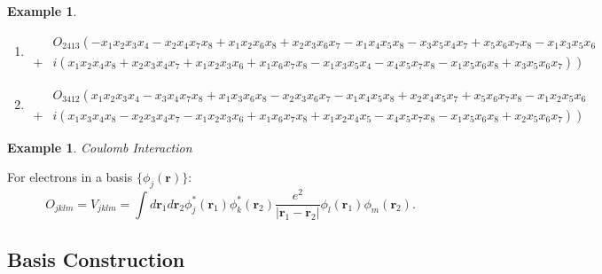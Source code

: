 \documentclass[aps,preprint]{revtex4}%
\newtheorem{example}[theorem]{Example}
\begin{document}
\begin{example}
\begin{enumerate}
\item
\begin{align}
&  O_{2413}\left(  -\overset{}{x_{1}x_{2}x_{3}x_{4}-x_{2}x_{4}x_{7}x_{8}%
+x_{1}x_{2}x_{6}x_{8}+x_{2}x_{3}x_{6}x_{7}-x_{1}x_{4}x_{5}x_{8}-x_{3}%
x_{5}x_{4}x_{7}+x_{5}x_{6}x_{7}x_{8}-x_{1}x_{3}x_{5}x_{6}}\right. \\
+  &  \left.  i\left(  \overset{}{x_{1}x_{2}x_{4}x_{8}+x_{2}x_{3}x_{4}%
x_{7}+x_{1}x_{2}x_{3}x_{6}+x_{1}x_{6}x_{7}x_{8}-x_{1}x_{3}x_{5}x_{4}%
-x_{4}x_{5}x_{7}x_{8}-x_{1}x_{5}x_{6}x_{8}+x_{3}x_{5}x_{6}x_{7}}\right)
\right)
\end{align}


\item
\begin{align}
&  O_{3412}\left(  \overset{}{x_{1}x_{2}x_{3}x_{4}-x_{3}x_{4}x_{7}x_{8}%
+x_{1}x_{3}x_{6}x_{8}-x_{2}x_{3}x_{6}x_{7}-x_{1}x_{4}x_{5}x_{8}+x_{2}%
x_{4}x_{5}x_{7}+x_{5}x_{6}x_{7}x_{8}-x_{1}x_{2}x_{5}x_{6}}\right. \\
+  &  \left.  i\left(  \overset{}{x_{1}x_{3}x_{4}x_{8}-x_{2}x_{3}x_{4}%
x_{7}-x_{1}x_{2}x_{3}x_{6}+x_{1}x_{6}x_{7}x_{8}+x_{1}x_{2}x_{4}x_{5}%
-x_{4}x_{5}x_{7}x_{8}-x_{1}x_{5}x_{6}x_{8}+x_{2}x_{5}x_{6}x_{7}}\right)
\right)
\end{align}

\end{enumerate}
\end{example}

\begin{example}
Coulomb Interaction
\end{example}

For electrons in a basis $\{\phi_{j}(\mathbf{r})\}$:
\[
O_{jklm}=V_{jklm}=\int d\mathbf{r}_{1}d\mathbf{r}_{2}\phi_{j}^{\ast
}(\mathbf{r}_{1})\phi_{k}^{\ast}(\mathbf{r}_{2})\frac{e^{2}}{|\mathbf{r}%
_{1}-\mathbf{r}_{2}|}\phi_{l}(\mathbf{r}_{1})\phi_{m}(\mathbf{r}_{2}).
\]


\subsection*{Basis Construction}
\end{document}
